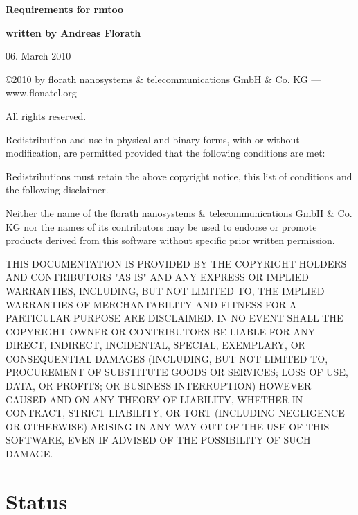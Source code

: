 \documentclass{article}
\begin{document}
\thispagestyle{empty}

\mbox{}

\vfill

{\LARGE\textbf{Requirements for rmtoo}}

\vfill

{\Large\textbf{written by Andreas Florath}}

\vfill

06. March 2010

\vfill

\newpage

\mbox{}

\vfill

{\small

\copyright 2010 by florath nanosystems \& telecommunications GmbH \& Co. KG
--- www.flonatel.org 

All rights reserved.

Redistribution and use in physical and binary forms, with or without
modification, are permitted provided that the following conditions are
met:

Redistributions must retain the above copyright notice, this list of
conditions and the following disclaimer.

Neither the name of the florath nanosystems \& telecommunications GmbH
\& Co. KG nor the names of its contributors may be used to endorse or
promote products derived from this software without specific prior
written permission.

THIS DOCUMENTATION IS PROVIDED BY THE COPYRIGHT HOLDERS AND
CONTRIBUTORS "AS IS" AND ANY EXPRESS OR IMPLIED WARRANTIES, INCLUDING,
BUT NOT LIMITED TO, THE IMPLIED WARRANTIES OF MERCHANTABILITY AND
FITNESS FOR A PARTICULAR PURPOSE ARE DISCLAIMED. IN NO EVENT SHALL THE
COPYRIGHT OWNER OR CONTRIBUTORS BE LIABLE FOR ANY DIRECT, INDIRECT,
INCIDENTAL, SPECIAL, EXEMPLARY, OR CONSEQUENTIAL DAMAGES (INCLUDING,
BUT NOT LIMITED TO, PROCUREMENT OF SUBSTITUTE GOODS OR SERVICES; LOSS
OF USE, DATA, OR PROFITS; OR BUSINESS INTERRUPTION) HOWEVER CAUSED AND
ON ANY THEORY OF LIABILITY, WHETHER IN CONTRACT, STRICT LIABILITY, OR
TORT (INCLUDING NEGLIGENCE OR OTHERWISE) ARISING IN ANY WAY OUT OF THE
USE OF THIS SOFTWARE, EVEN IF ADVISED OF THE POSSIBILITY OF SUCH
DAMAGE.
}
\newpage

\tableofcontents

\newpage

\section{Status}

\end{document}
